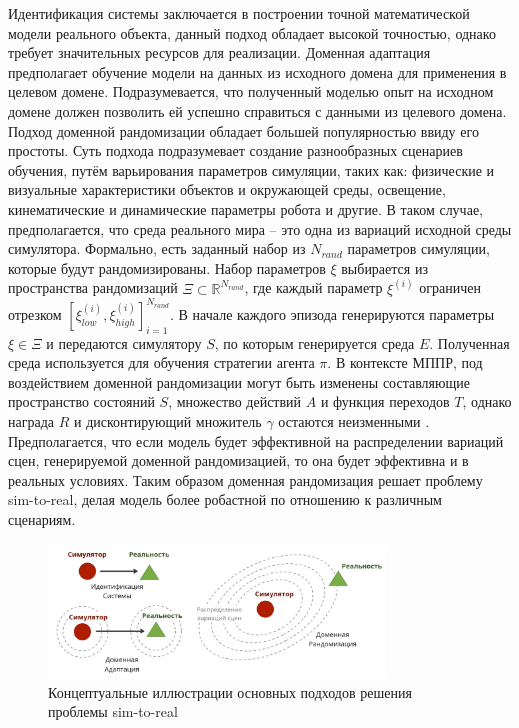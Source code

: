     Идентификация системы заключается в построении точной математической модели реального объекта, данный подход обладает высокой точностью, однако требует значительных ресурсов для реализации. Доменная адаптация предполагает обучение модели на данных из исходного домена для применения в целевом домене. Подразумевается, что полученный моделью опыт на исходном домене должен позволить ей успешно справиться с данными из целевого домена. Подход доменной рандомизации обладает большей популярностью ввиду его простоты. Суть подхода подразумевает создание разнообразных сценариев обучения, путём варьирования параметров симуляции, таких как: физические и визуальные характеристики объектов и окружающей среды, освещение, кинематические и динамические параметры робота и другие. В таком случае, предполагается, что среда реального мира -- это одна из вариаций исходной среды симулятора. Формально, есть заданный набор из $N_{rand}$ параметров симуляции, которые будут рандомизированы. Набор параметров $\xi$ выбирается из пространства рандомизаций $\Xi \subset \mathbb{R}^{N_{rand}}$, где каждый параметр $\xi^{(i)}$ ограничен отрезком $\left[ \xi^{(i)}_{low}, \xi^{(i)}_{high} \right]^{N_{rand}}_{i=1}$. В начале каждого эпизода генерируются параметры $\xi \in \Xi$ и передаются симулятору $S$, по которым генерируется среда $E$. Полученная среда используется для обучения стратегии агента $\pi$. В контексте МППР, под воздействием доменной рандомизации могут быть изменены составляющие пространство состояний $S$, множество действий $A$ и функция переходов $T$, однако награда $R$ и дисконтирующий множитель $\gamma$ остаются неизменными \cite{mehta2020active}. Предполагается, что если модель будет эффективной на распределении вариаций сцен, генерируемой доменной рандомизацией, то она будет эффективна и в реальных условиях. Таким образом доменная рандомизация решает проблему sim-to-real, делая модель более робастной по отношению к различным сценариям.  

    \begin{figure}
        \begin{center}
            \includegraphics[width=0.8\textwidth]{images/sim2real.jpg}
        \caption{Концептуальные иллюстрации основных подходов решения проблемы sim-to-real \cite{weng2019DR}}
        \label{fig:sim2real}
        \end{center}
    \end{figure}

